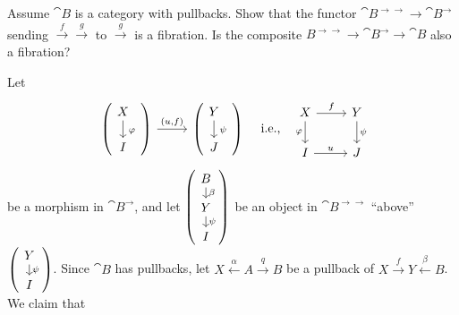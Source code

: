 \begin{exercise}
Assume \(\cat{B}\) is a category with pullbacks.
Show that the functor \(\cat{B}^{\rightarrow\rightarrow} \to \cat{B}^\rightarrow\) sending \(\overset{f}{\to}\overset{g}{\to}\) to \(\overset{g}{\to}\) is a fibration.
Is the composite \(B^{\rightarrow\rightarrow} \to \cat{B}^{\rightarrow} \to \cat{B}\) also a fibration?
\end{exercise}

\begin{solution}
Let
\begin{align*}
\begin{tikzcd}[ampersand replacement=\&,]
\begin{pmatrix}
\begin{tikzpicture}
        \node(1){\(X\)}; 
        \node(2)[below of=1]{\(I\)};
        \draw[->](1)--node[right]{\scriptsize\(\varphi\)} (2);
\end{tikzpicture}
\end{pmatrix}
\arrow[r, "{(u, f)}"]
\&
\begin{pmatrix}
\begin{tikzpicture}
        \node(1){\(Y\)};
        \node(2)[below of=1]{\(J\)};
        \draw[->](1)--node[right]{\scriptsize\(\psi\)} (2);
\end{tikzpicture}
\end{pmatrix}
\end{tikzcd}
&&\text{i.e.,}
&&
\begin{tikzcd}[ampersand replacement=\&,]
X \arrow[r, "f"] \arrow[d, "\varphi"{left}] \& Y \arrow[d, "\psi"] \\
I \arrow[r, "u"] \& J
\end{tikzcd}
\end{align*}
be a morphism in \(\cat{B}^{\rightarrow}\), and let \(\begin{pmatrix}\begin{tikzcd}[row sep=small] B \arrow[d, "\beta"] \\ Y \arrow[d, "\psi"] \\ I\end{tikzcd}\end{pmatrix}\) be an object in \(\cat{B}^{\rightarrow\rightarrow}\) ``above'' \(\begin{pmatrix}\begin{tikzcd}[row sep=small] Y \arrow[d, "\psi"] \\ I\end{tikzcd}\end{pmatrix}\).
Since \(\cat{B}\) has pullbacks, let \(X \overset{\alpha}{\leftarrow} A \overset{q}{\rightarrow} B\) be a pullback of \(X \overset{f}{\to} Y \overset{\beta}{\leftarrow} B\). We claim that

\end{solution}

